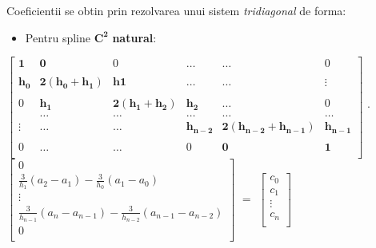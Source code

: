 \documentclass{article}
\begin{document}
Coeficientii  se obtin prin rezolvarea unui sistem \textit{tridiagonal} de forma:\\

\begin{itemize}
    \item Pentru spline $\mathbf{C^2}$ \textbf{natural}:
\end{itemize}
\hspace{-2cm}$\begin{bmatrix}
    \mathbf{1} & \mathbf{0} & 0 & \dots & \dots & 0 \\\\
    \mathbf{h_0} & \mathbf{2(h_0+h_1)} & \mathbf{h1} & \dots  & \dots & \vdots \\\\
    0 & \mathbf{h_1} & \mathbf{2(h_1+h_2)} & \mathbf{h_2} & \dots & 0 \\
     & \dots & \dots & \dots & \dots & \dots \\
    \vdots & \dots & \dots & \mathbf{h_{n-2}} & \mathbf{2(h_{n-2}+h_{n-1})} & \mathbf{h_{n-1}} \\\\
    0 & \dots & \dots & 0 & \mathbf{0} & \mathbf{1} \\
\end{bmatrix}$
$\cdot$
$\begin{bmatrix}
    0 \\
    \frac{3}{h_1}(a_2-a_1) - \frac{3}{h_0}(a_1-a_0) \\
    \vdots \\
    \frac{3}{h_{n-1}}(a_n-a_{n-1}) - \frac{3}{h_{n-2}}(a_{n-1}-a_{n-2}) \\
    0 \\
\end{bmatrix}$
$=$
$\begin{bmatrix}
    c_0 \\
    c_1 \\
    \vdots \\
    c_n \\
\end{bmatrix}$\\
\end{document}
